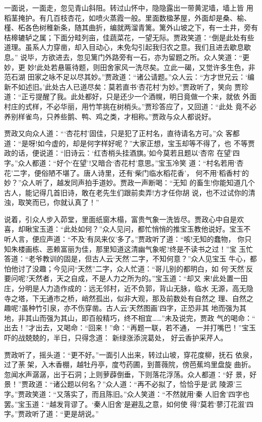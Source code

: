 一面说，一面走，忽见青山斜阻。转过山怀中，隐隐露出一带黄泥墙，墙上皆
用稻茎掩护。有几百枝杏花，如喷火蒸霞一般。里面数楹茅屋，外面却是桑、榆、
槿、柘各色树稚新条，随其曲折，编就两溜青篱。篱外山坡之下，有一土井，旁有
桔槔辘轳之属；下面分畦列亩，佳蔬菜花，一望无际。贾政笑道：“倒是此处有些
道理。虽系人力穿凿，却入目动心，未免勾引起我归农之意。我们且进去歇息歇息。”
说毕，方欲进去，忽见篱门外路旁有一石，亦为留题之所。众人笑道：“更妙，更
妙!此处若悬匾待题，则田舍家风一洗尽矣。立此一碣，又觉许多生色，非范石湖
田家之咏不足以尽其妙。”贾政道：“诸公请题。”众人云：“方才世兄云：‘编
新不如述旧。’此处古人已道尽矣：莫若直书‘杏花村’为妙。”贾政听了，笑向
贾珍道：“正亏提醒了我。此处都好，只是还少一个酒幌，明日竟做一个来，就依
外面村庄的式样，不必华丽，用竹竿挑在树梢头。”贾珍答应了，又回道：“此处
竟不必养别样雀鸟，只养些鹅、鸭、鸡之类，才相称。”贾政与众人都说好。

贾政又向众人道：“‘杏花村’固佳，只是犯了正村名，直待请名方可。”众
客都道：“是呀!如今虚的，却是何字样好呢？”大家正想，宝玉却等不得了，也
不等贾政的话，便说道：“旧诗云：‘红杏梢头挂酒旗。’如今莫若且题以‘杏帘
在望’四字。”众人都道：“好个‘在望’!又暗合‘杏花村’意思。”宝玉冷笑
道：“村名若用‘杏花’二字，便俗陋不堪了。唐人诗里，还有‘柴门临水稻花香’，
何不用‘稻香村’的妙？”众人听了，越发同声拍手道妙。贾政一声断喝：“无知
的畜生!你能知道几个古人，能记得几首旧诗，敢在老先生们跟前卖弄!方才任你胡
说，也不过试你的清浊，取笑而已，你就认真了！”

说着，引众人步入茆堂，里面纸窗木榻，富贵气象一洗皆尽。贾政心中自是欢
喜，却瞅宝玉道：“此处如何？”众人见问，都忙悄悄的推宝玉教他说好。宝玉不
听人言，便应声道：“不及‘有凤来仪’多了。”贾政听了道：“咳!无知的蠢物，
你只知朱楼画栋、恶赖富丽为佳，那里知道这清幽气象呢?终是不读书之过！”宝
玉忙答道：“老爷教训的固是，但古人云‘天然’二字，不知何意？”众人见宝玉
牛心，都怕他讨了没趣；今见问“天然”二字，众人忙道：“哥儿别的都明白，如
何‘天然’反要问呢?天然者，天之自成，不是人力之所为的。”宝玉道：“却又
来!此处置一田庄，分明是人力造作成的：远无邻村，近不负郭，背山无脉，临水
无源，高无隐寺之塔，下无通市之桥，峭然孤出，似非大观，那及前数处有自然之
理、自然之趣呢?虽种竹引泉，亦不伤穿凿。古人云‘天然图画’四字，正恐非其
地而强为其地，非其山而强为其山，即百般精巧，终不相宜……”未及说完，贾政
气的喝命：“出去！”才出去，又喝命：“回来！”命：“再题一联，若不通，
一并打嘴巴！”宝玉吓的战兢兢的，半日，只得念道：
新绿涨添浣葛处，
好云香护采芹人。

贾政听了，摇头道：“更不好。”一面引人出来，转过山坡，穿花度柳，抚石
依泉，过了荼架，入木香棚，越牡丹亭，度芍药圃，到蔷薇院，傍芭蕉坞里盘旋
曲折。忽闻水声潺潺，出于石洞；上则萝薜倒垂，下则落花浮荡。众人都道：“好
景，好景！”贾政道：“诸公题以何名？”众人道：“再不必拟了，恰恰乎是‘武
陵源’三字。”贾政笑道：“又落实了，而且陈旧。”众人笑道：“不然就用‘秦
人旧舍’四字也罢。”宝玉道：“越发背谬了。‘秦人旧舍’是避乱之意，如何使
得?莫若‘蓼汀花溆’四字。”贾政听了道：“更是胡说。”

